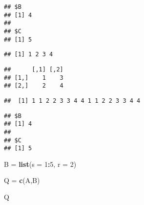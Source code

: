 \documentclass[]{article}
\newenvironment{Shaded}{\begin{snugshade}}{\end{snugshade}}
\newcommand{\KeywordTok}[1]{\textcolor[rgb]{0.13,0.29,0.53}{\textbf{#1}}}
\newcommand{\DataTypeTok}[1]{\textcolor[rgb]{0.13,0.29,0.53}{#1}}
\newcommand{\DecValTok}[1]{\textcolor[rgb]{0.00,0.00,0.81}{#1}}
\newcommand{\StringTok}[1]{\textcolor[rgb]{0.31,0.60,0.02}{#1}}
\newcommand{\OperatorTok}[1]{\textcolor[rgb]{0.81,0.36,0.00}{\textbf{#1}}}
\newcommand{\NormalTok}[1]{#1}
\begin{document}
\begin{verbatim}
## $B
## [1] 4
## 
## $C
## [1] 5
\end{verbatim}

\begin{Shaded}
\end{Shaded}

\begin{verbatim}
## [1] 1 2 3 4
\end{verbatim}

\begin{Shaded}
\end{Shaded}

\begin{verbatim}
##      [,1] [,2]
## [1,]    1    3
## [2,]    2    4
\end{verbatim}

\begin{Shaded}
\end{Shaded}

\begin{verbatim}
##  [1] 1 1 2 2 3 3 4 4 1 1 2 2 3 3 4 4
\end{verbatim}

\begin{Shaded}
\end{Shaded}

\begin{verbatim}
## $B
## [1] 4
## 
## $C
## [1] 5
\end{verbatim}

\begin{Shaded}
\begin{Highlighting}[]
\NormalTok{B =}\StringTok{ }\KeywordTok{list}\NormalTok{(}\DataTypeTok{s =} \DecValTok{1}\OperatorTok{:}\DecValTok{5}\NormalTok{, }\DataTypeTok{r =} \DecValTok{2}\NormalTok{)}

\NormalTok{Q =}\StringTok{ }\KeywordTok{c}\NormalTok{(A,B)}

\NormalTok{Q}
\end{Highlighting}
\end{Shaded}
\end{document}
